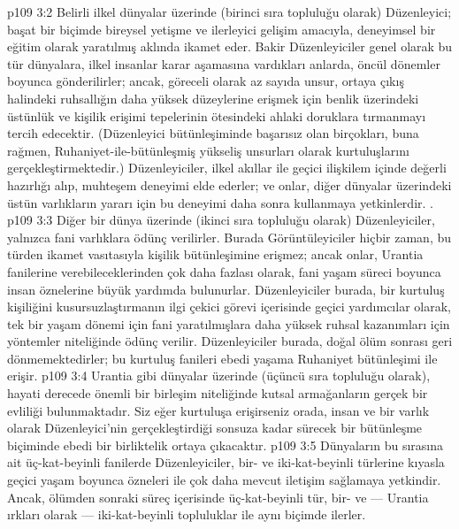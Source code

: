 \vs p109 3:2 Belirli ilkel dünyalar üzerinde (birinci sıra topluluğu olarak) Düzenleyici; başat bir biçimde bireysel yetişme ve ilerleyici gelişim amacıyla, deneyimsel bir eğitim olarak yaratılmış aklında ikamet eder. Bakir Düzenleyiciler genel olarak bu tür dünyalara, ilkel insanlar karar aşamasına vardıkları anlarda, öncül dönemler boyunca gönderilirler; ancak, göreceli olarak az sayıda unsur, ortaya çıkış halindeki ruhsallığın daha yüksek düzeylerine erişmek için benlik üzerindeki üstünlük ve kişilik erişimi tepelerinin ötesindeki ahlaki doruklara tırmanmayı tercih edecektir. (Düzenleyici bütünleşiminde başarısız olan birçokları, buna rağmen, Ruhaniyet\hyp{}ile\hyp{}bütünleşmiş yükseliş unsurları olarak kurtuluşlarını gerçekleştirmektedir.) Düzenleyiciler, ilkel akıllar ile geçici ilişkilem içinde değerli hazırlığı alıp, muhteşem deneyimi elde ederler; ve onlar, diğer dünyalar üzerindeki üstün varlıkların yararı için bu deneyimi daha sonra kullanmaya yetkinlerdir. .
\vs p109 3:3 Diğer bir dünya üzerinde (ikinci sıra topluluğu olarak) Düzenleyiciler, yalnızca fani varlıklara ödünç verilirler. Burada Görüntüleyiciler hiçbir zaman, bu türden ikamet vasıtasıyla kişilik bütünleşimine erişmez; ancak onlar, Urantia fanilerine verebileceklerinden çok daha fazlası olarak, fani yaşam süreci boyunca insan öznelerine büyük yardımda bulunurlar. Düzenleyiciler burada, bir kurtuluş kişiliğini kusursuzlaştırmanın ilgi çekici görevi içerisinde geçici yardımcılar olarak, tek bir yaşam dönemi için fani yaratılmışlara daha yüksek ruhsal kazanımları için yöntemler niteliğinde ödünç verilir. Düzenleyiciler burada, doğal ölüm sonrası geri dönmemektedirler; bu kurtuluş fanileri ebedi yaşama Ruhaniyet bütünleşimi ile erişir.
\vs p109 3:4 Urantia gibi dünyalar üzerinde (üçüncü sıra topluluğu olarak), hayati derecede önemli bir birleşim niteliğinde kutsal armağanların gerçek bir evliliği bulunmaktadır. Siz eğer kurtuluşa erişirseniz orada, insan ve bir varlık olarak Düzenleyici’nin gerçekleştirdiği sonsuza kadar sürecek bir bütünleşme biçiminde ebedi bir birliktelik ortaya çıkacaktır.
\vs p109 3:5 Dünyaların bu sırasına ait üç\hyp{}kat\hyp{}beyinli fanilerde Düzenleyiciler, bir\hyp{} ve iki\hyp{}kat\hyp{}beyinli türlerine kıyasla geçici yaşam boyunca özneleri ile çok daha mevcut iletişim sağlamaya yetkindir. Ancak, ölümden sonraki süreç içerisinde üç\hyp{}kat\hyp{}beyinli tür, bir\hyp{} ve --- Urantia ırkları olarak --- iki\hyp{}kat\hyp{}beyinli topluluklar ile aynı biçimde ilerler.
